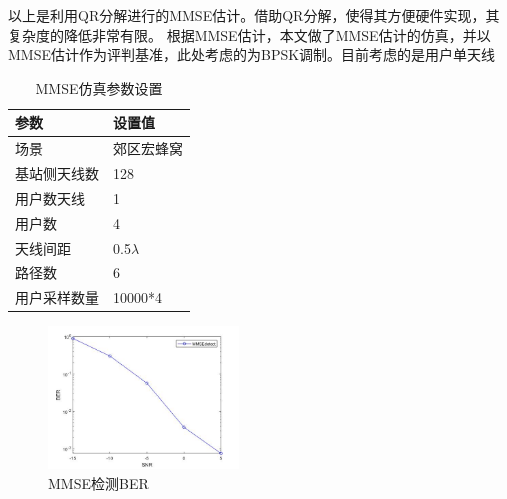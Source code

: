 \documentclass[bachelor,nocolorlinks, printoneside]{seuthesis} %
\begin{document}
\begin{Main}
以上是利用QR分解进行的MMSE估计。借助QR分解，使得其方便硬件实现，其复杂度的降低非常有限。
根据MMSE估计，本文做了MMSE估计的仿真，并以MMSE估计作为评判基准，此处考虑的为BPSK调制。目前考虑的是用户单天线
\begin{table}[htbp]
	\centering
	\caption{\label{tab:test}MMSE仿真参数设置}
	\begin{tabular}{ll}
		\toprule
		参数 &  设置值 \\
		\bottomrule
		场景 &  郊区宏蜂窝 \\
		\bottomrule
		基站侧天线数 & 128 \\
		\bottomrule
		用户数天线	& 1 \\
		\bottomrule
		用户数	& 4 \\
		\bottomrule
		天线间距 & 0.5$\lambda$ \\
		\bottomrule
		路径数 & 6 \\
		\bottomrule
		用户采样数量 & 10000*4 \\
		\bottomrule
	\end{tabular}
\end{table}
\begin{figure}[htbp!]
	\centering \includegraphics[width=0.45\textwidth]{img/3_1.jpg} \caption{MMSE检测BER}
\end{figure}


\end{Main}
\end{document}
